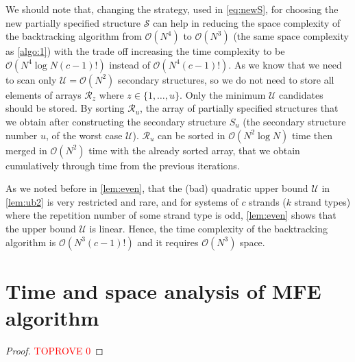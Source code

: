 \begin{remark}\label{remark:newT}
	We should note that, changing the strategy, used in \cref{eq:newS}, for choosing the new partially specified structure $\mathcal{S}$ can help in reducing the space complexity of the backtracking algorithm from $\mathcal{O}(N^4)$ to $\mathcal{O}(N^3)$ (the same space complexity as \snMFE \cref{algo:1}) with the trade off increasing the time complexity to be $\mathcal{O}(N^4 \log N(c-1)!)$ instead of $\mathcal{O}(N^4 (c-1)!)$. As we know that we need to scan only $\mathcal{U} = \mathcal{O}(N^2)$ secondary structures, so we do not need to store all elements of arrays $\mathcal{R}_z$ where $z \in \{1,\ldots,u\}$. 
	Only the minimum $\mathcal{U}$ candidates should be stored. By sorting $\mathcal{R}_u$, the array of partially specified structures that we obtain after constructing the secondary structure $S_u$ (the secondary structure number $u$, of the worst case $\mathcal{U}$). $\mathcal{R}_u$ can be sorted in $\mathcal{O}(N^2 \log N)$ time then merged in $\mathcal{O}(N^2)$ time with the already sorted array, that we obtain cumulatively through time from the previous iterations.        
\end{remark} 

As we noted before in \cref{lem:even}, that the (bad) quadratic upper bound $\mathcal{U}$ in \cref{lem:ub2} is very restricted and rare, and 
for systems of $c$ strands ($k$ strand types) where the repetition number of some strand type is odd, \cref{lem:even} shows that the upper bound $\mathcal{U}$ is linear. Hence, the time complexity of the backtracking algorithm is $\mathcal{O}(N^3(c-1)!)$ and it requires $\mathcal{O}(N^3)$ space.




\section{Time and space analysis of MFE algorithm}\label{sec:analysis}

\main*


\begin{proof}\textcolor{red}{TOPROVE 0}\end{proof}

